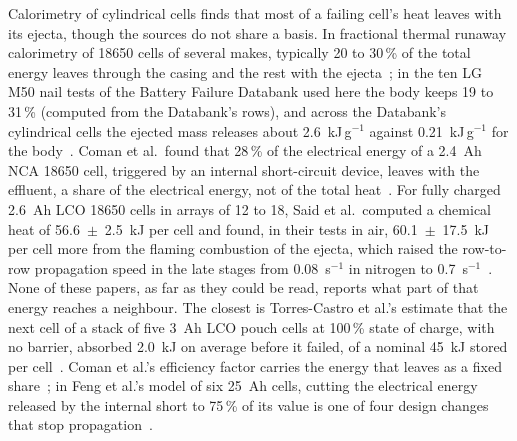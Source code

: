 \documentclass[preprint,12pt]{elsarticle}
\begin{document}
Calorimetry of cylindrical cells finds that most of a failing cell's heat leaves with its ejecta, though the sources do not share a basis. In fractional thermal runaway calorimetry of 18650 cells of several makes, typically 20 to 30\,\% of the total energy leaves through the casing and the rest with the ejecta~\cite{walker2019decoupling}; in the ten LG M50 nail tests of the Battery Failure Databank used here the body keeps 19 to 31\,\% (computed from the Databank's rows), and across the Databank's cylindrical cells the ejected mass releases about 2.6~kJ\,g$^{-1}$ against 0.21~kJ\,g$^{-1}$ for the body~\cite{finegan2024databank}. Coman et al.\ found that 28\,\% of the electrical energy of a 2.4~Ah NCA 18650 cell, triggered by an internal short-circuit device, leaves with the effluent, a share of the electrical energy, not of the total heat~\cite{coman2017modelling}. For fully charged 2.6~Ah LCO 18650 cells in arrays of 12 to 18, Said et al.\ computed a chemical heat of 56.6~$\pm$~2.5~kJ per cell and found, in their tests in air, 60.1~$\pm$~17.5~kJ per cell more from the flaming combustion of the ejecta, which raised the row-to-row propagation speed in the late stages from 0.08~s$^{-1}$ in nitrogen to 0.7~s$^{-1}$~\cite{said2019cascading}. None of these papers, as far as they could be read, reports what part of that energy reaches a neighbour. The closest is Torres-Castro et al.'s estimate that the next cell of a stack of five 3~Ah LCO pouch cells at 100\,\% state of charge, with no barrier, absorbed 2.0~kJ on average before it failed, of a nominal 45~kJ stored per cell~\cite{torrescastro2020passive}. Coman et al.'s efficiency factor carries the energy that leaves as a fixed share~\cite{coman2017modelling}; in Feng et al.'s model of six 25~Ah cells, cutting the electrical energy released by the internal short to 75\,\% of its value is one of four design changes that stop propagation~\cite{feng2015propagation}.
\end{document}
